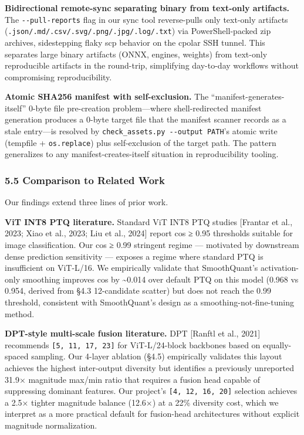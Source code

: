 \documentclass[
]{article}
\begin{document}
\textbf{Bidirectional remote-sync separating binary from text-only
artifacts.} The \texttt{-\/-pull-reports} flag in our sync tool
reverse-pulls only text-only artifacts
(\texttt{.json/.md/.csv/.svg/.png/.jpg/.log/.txt}) via PowerShell-packed
zip archives, sidestepping flaky scp behavior on the cpolar SSH tunnel.
This separates large binary artifacts (ONNX, engines, weights) from
text-only reproducible artifacts in the round-trip, simplifying
day-to-day workflows without compromising reproducibility.

\textbf{Atomic SHA256 manifest with self-exclusion.} The
``manifest-generates-itself'' 0-byte file pre-creation problem---where
shell-redirected manifest generation produces a 0-byte target file that
the manifest scanner records as a stale entry---is resolved by
\texttt{check\_assets.py\ -\/-output\ PATH}'s atomic write (tempfile +
\texttt{os.replace}) plus self-exclusion of the target path. The pattern
generalizes to any manifest-creates-itself situation in reproducibility
tooling.

\subsubsection{5.5 Comparison to Related
Work}\label{comparison-to-related-work}

Our findings extend three lines of prior work.

\textbf{ViT INT8 PTQ literature.} Standard ViT INT8 PTQ studies
{[}Frantar et al., 2023; Xiao et al., 2023; Liu et al., 2024{]} report
cos ≥ 0.95 thresholds suitable for image classification. Our cos ≥ 0.99
stringent regime --- motivated by downstream dense prediction
sensitivity --- exposes a regime where standard PTQ is insufficient on
ViT-L/16. We empirically validate that SmoothQuant's activation-only
smoothing improves cos by \textasciitilde0.014 over default PTQ on this
model (0.968 vs 0.954, derived from §4.3 12-candidate scatter) but does
not reach the 0.99 threshold, consistent with SmoothQuant's design as a
smoothing-not-fine-tuning method.

\textbf{DPT-style multi-scale fusion literature.} DPT {[}Ranftl et al.,
2021{]} recommends \texttt{{[}5,\ 11,\ 17,\ 23{]}} for ViT-L/24-block
backbones based on equally-spaced sampling. Our 4-layer ablation (§4.5)
empirically validates this layout achieves the highest inter-output
diversity but identifies a previously unreported 31.9× magnitude max/min
ratio that requires a fusion head capable of suppressing dominant
features. Our project's \texttt{{[}4,\ 12,\ 16,\ 20{]}} selection
achieves a 2.5× tighter magnitude balance (12.6×) at a 22\% diversity
cost, which we interpret as a more practical default for fusion-head
architectures without explicit magnitude normalization.
\end{document}
